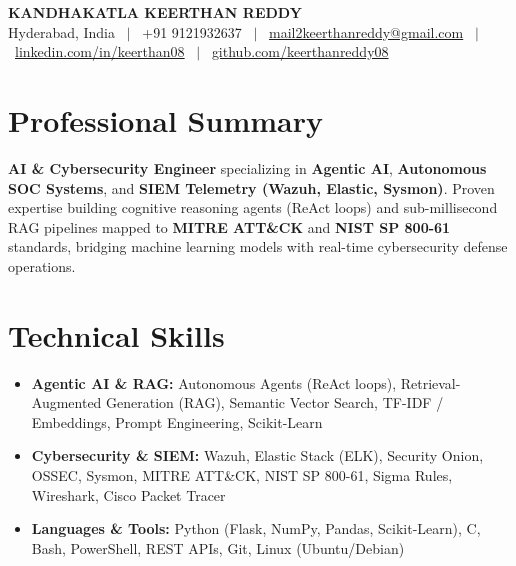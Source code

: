 \documentclass[a4paper,10pt]{article}
\begin{document}
\pagestyle{empty}

\begin{center}
    {\huge\textbf{\color{primary} KANDHAKATLA KEERTHAN REDDY}}\\[3pt]
    \small Hyderabad, India \ $|$ \ +91 9121932637 \ $|$ \ 
    \href{mailto:mail2keerthanreddy@gmail.com}{mail2keerthanreddy@gmail.com} \ $|$ \ 
    \href{https://linkedin.com/in/keerthan08}{linkedin.com/in/keerthan08} \ $|$ \ 
    \href{https://github.com/keerthanreddy08}{github.com/keerthanreddy08}
\end{center}

\section{Professional Summary}
\small{\textbf{AI \& Cybersecurity Engineer} specializing in \textbf{Agentic AI}, \textbf{Autonomous SOC Systems}, and \textbf{SIEM Telemetry (Wazuh, Elastic, Sysmon)}. Proven expertise building cognitive reasoning agents (ReAct loops) and sub-millisecond RAG pipelines mapped to \textbf{MITRE ATT\&CK} and \textbf{NIST SP 800-61} standards, bridging machine learning models with real-time cybersecurity defense operations.}

\section{Technical Skills}
\begin{itemize}[leftmargin=0.2em, itemsep=1.5pt]
    \item[] \textbf{Agentic AI \& RAG:} Autonomous Agents (ReAct loops), Retrieval-Augmented Generation (RAG), Semantic Vector Search, TF-IDF / Embeddings, Prompt Engineering, Scikit-Learn
    \item[] \textbf{Cybersecurity \& SIEM:} Wazuh, Elastic Stack (ELK), Security Onion, OSSEC, Sysmon, MITRE ATT\&CK, NIST SP 800-61, Sigma Rules, Wireshark, Cisco Packet Tracer
    \item[] \textbf{Languages \& Tools:} Python (Flask, NumPy, Pandas, Scikit-Learn), C, Bash, PowerShell, REST APIs, Git, Linux (Ubuntu/Debian)
\end{itemize}

\end{document}
